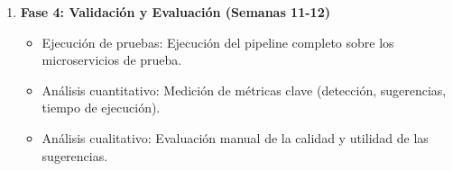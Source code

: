 \begin{enumerate}
    \item \textbf{Fase 4: Validación y Evaluación (Semanas 11-12)}
    \begin{itemize}
        \item Ejecución de pruebas: Ejecución del pipeline completo sobre los microservicios de prueba.
        \item Análisis cuantitativo: Medición de métricas clave (detección, sugerencias, tiempo de ejecución).
        \item Análisis cualitativo: Evaluación manual de la calidad y utilidad de las sugerencias.
    \end{itemize}
\end{enumerate}
